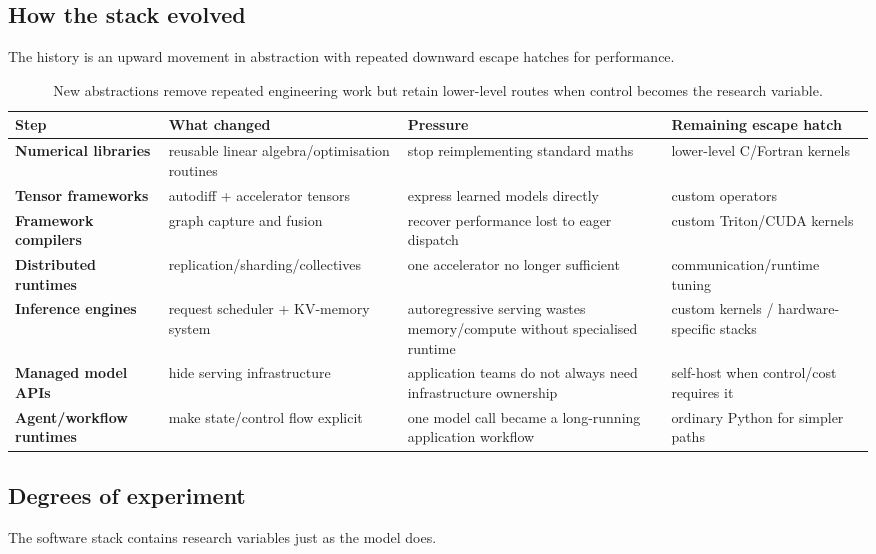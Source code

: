 \subsection{How the stack evolved}

The history is an upward movement in abstraction with repeated downward escape hatches for performance.

\begin{table}[ht]
\centering
\small
\begin{tabularx}{\textwidth}{>{\bfseries}p{2.5cm} X X X}
\toprule
Step & What changed & Pressure & Remaining escape hatch \\
\midrule
Numerical libraries & reusable linear algebra/optimisation routines & stop reimplementing standard maths & lower-level C/Fortran kernels \\
Tensor frameworks & autodiff + accelerator tensors & express learned models directly & custom operators \\
Framework compilers & graph capture and fusion & recover performance lost to eager dispatch & custom Triton/CUDA kernels \\
Distributed runtimes & replication/sharding/collectives & one accelerator no longer sufficient & communication/runtime tuning \\
Inference engines & request scheduler + KV-memory system & autoregressive serving wastes memory/compute without specialised runtime & custom kernels / hardware-specific stacks \\
Managed model APIs & hide serving infrastructure & application teams do not always need infrastructure ownership & self-host when control/cost requires it \\
Agent/workflow runtimes & make state/control flow explicit & one model call became a long-running application workflow & ordinary Python for simpler paths \\
\bottomrule
\end{tabularx}
\caption{New abstractions remove repeated engineering work but retain lower-level routes when control becomes the research variable.}
\end{table}


\subsection{Degrees of experiment}

The software stack contains research variables just as the model does.

